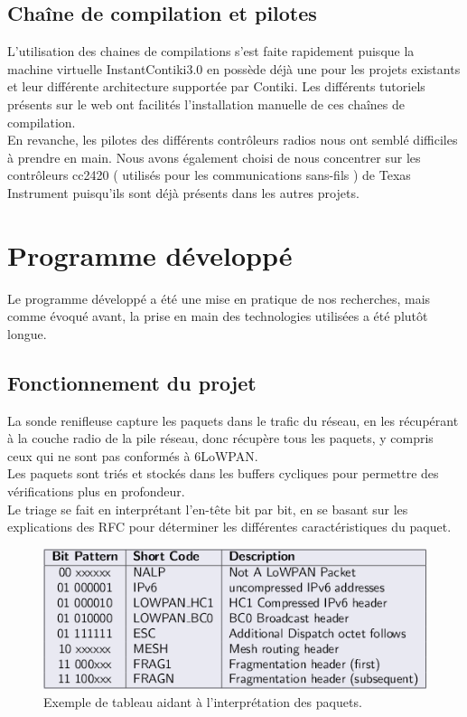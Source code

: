 	\subsection{Chaîne de compilation et pilotes}
	L'utilisation des chaines de compilations s'est faite rapidement puisque la machine virtuelle InstantContiki3.0 en possède déjà une pour les projets existants et leur différente architecture supportée par Contiki. Les différents tutoriels présents sur le web ont facilités l'installation manuelle de ces chaînes de compilation.\\
	En revanche, les pilotes des différents contrôleurs radios nous ont semblé difficiles à prendre en main. Nous avons également choisi de nous concentrer sur les contrôleurs cc2420 ( utilisés pour les communications sans-fils ) de Texas Instrument puisqu'ils sont déjà présents dans les autres projets.

\section{Programme développé}
	Le programme développé a été une mise en pratique de nos recherches, mais comme évoqué avant, la prise en main des technologies utilisées a été plutôt longue.
	\subsection{Fonctionnement du projet}
		La sonde renifleuse capture les paquets dans le trafic du réseau, en les récupérant à la couche radio de la pile réseau, donc récupère tous les paquets, y compris ceux qui ne sont pas conformés à 6LoWPAN.\\
		Les paquets sont triés et stockés dans les buffers cycliques pour permettre des vérifications plus en profondeur.\\
		Le triage se fait en interprétant l'en-tête bit par bit, en se basant sur les explications des RFC pour déterminer les différentes caractéristiques du paquet.
		\begin{figure}[htp]
			\centering
			\includegraphics[width=15cm]{images/parsing}
			\caption{Exemple de tableau aidant à l'interprétation des paquets.}
			\label{fig:parsing}
		\end{figure}
